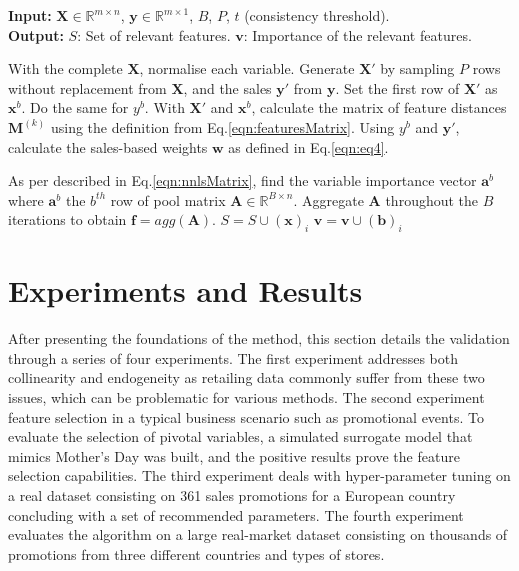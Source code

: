\documentclass{ieeeaccess}
\begin{document}
\renewcommand{\algorithmiccomment}[2]{// #2}
\begin{algorithm}
\caption{Pseudo-code for fast Feature Selection: Sub-sampling}
\label{alg:2}
\textbf{Input:} $\mathbf{X} \in \mathbb{R}^{m\times n}$, $\mathbf{y} \in \mathbb{R}^{m\times 1}$, $B$, $P$, $t$ (consistency threshold).\\
\textbf{Output: } $S$: Set of relevant features. $\mathbf{v}$: Importance of the relevant features.\\

\begin{algorithmic}[2] 
\State With the complete $\mathbf{X}$, normalise each variable.
\State Generate $\mathbf{X'}$ by sampling $P$ rows without replacement from $\mathbf{X}$, and the sales $\mathbf{y'}$ from $\mathbf{y}$.
\State Set the first row of $\mathbf{X'}$ as $\mathbf{x}^b$. Do the same for $y^b$.
\State With $\mathbf{X'}$ and $\mathbf{x}^b$, calculate the matrix of feature distances $\mathbf{M}^{(k)}$ using the definition from Eq.\eqref{eqn:featuresMatrix}.
\State Using $y^b$ and $\mathbf{y'}$, calculate the sales-based weights $\mathbf{w}$ as defined in Eq.\eqref{eqn:eq4}.

\State As per described in Eq.\eqref{eqn:nnlsMatrix}, find the variable importance vector $\mathbf{a}^b$ where $\mathbf{a}^b$ the $b^{th}$ row of pool matrix $\mathbf{A} \in \mathbb{R}^{B\times n}$.
\EndFor
\State Aggregate $\mathbf{A}$ throughout the $B$ iterations to obtain $\mathbf{f} = agg(\mathbf{A})$.
\State $S = S \cup (\mathbf x)_ i$
\State $\mathbf{v} = \mathbf{v} \cup (\mathbf b)_ i$
 \EndIf
\EndFor
\end{algorithmic}
\end{algorithm}

\section{Experiments and Results} \label{sect:Experiments}

After presenting the foundations of the method, this section details the validation through a series of four experiments. The first experiment addresses both collinearity and endogeneity as retailing data commonly suffer from these two issues, which can be problematic for various methods. The second experiment feature selection in a typical business scenario such as promotional events. To evaluate the selection of pivotal variables, a simulated surrogate model that mimics Mother's Day was built, and the positive results prove the feature selection capabilities. The third experiment deals with hyper-parameter tuning on a real dataset consisting on 361 sales promotions for a European country concluding with a set of recommended parameters. The fourth experiment evaluates the algorithm on a large real-market dataset consisting on thousands of promotions from three different countries and types of stores.
\end{document}
